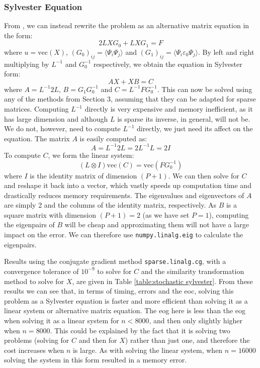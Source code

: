 \documentclass[11pt]{article}
\numberwithin{equation}{section}
\begin{document}
\subsubsection*{Sylvester Equation}
From \cite{Powell}, we can instead rewrite the problem as an alternative matrix equation in the form:
\begin{equation}
2LXG_0 + LXG_1 = F
\end{equation}
where $u = \text{vec}(X)$, $(G_0)_{ij} = \langle \Psi_i \Psi_j \rangle$ and $(G_1)_{ij} = \langle \Psi_i \varepsilon_0 \Psi_j \rangle$. By left and right multiplying by $L^{-1}$ and $G_0^{-1}$ respectively, we obtain the equation in Sylvester form:
\begin{equation}
AX + XB = C
\end{equation}
where $A = L^{-1}2L$, $B = G_1 G_0^{-1}$ and $C = L^{-1} F G_0^{-1}$. This can now be solved using any of the methods from Section 3, assuming that they can be adapted for sparse matrices. Computing $L^{-1}$ directly is very expensive and memory inefficient, as it has large dimension and although $L$ is sparse its inverse, in general, will not be. We do not, however, need to compute $L^{-1}$ directly, we just need its affect on the equation. The matrix $A$ is easily computed as: 
\[ A = L^{-1}2L = 2L^{-1}L = 2I \]
To compute $C$, we form the linear system:
\begin{equation}
(L \otimes I)\text{vec}(C) = \text{vec}(FG_0^{-1})
\end{equation}
where $I$ is the identity matrix of dimension $(P+1)$. We can then solve for $C$ and reshape it back into a vector, which vastly speeds up computation time and drastically reduces memory requirements. The eigenvalues and eigenvectors of $A$ are simply 2 and the columns of the identity matrix, respectively. As $B$ is a square matrix with dimension $(P+1)=2$ (as we have set $P=1$), computing the eigenpairs of $B$ will be cheap and approximating them will not have a large impact on the error. We can therefore use \texttt{numpy.linalg.eig} to calculate the eigenpairs.

Results using the conjugate gradient method \texttt{sparse.linalg.cg}, with a convergence tolerance of $10^{-9}$ to solve for $C$ and the similarity transformation method to solve for $X$, are given in Table \ref{table:stochastic sylvester}. From these results we can see that, in terms of timing, errors and the eoc, solving this problem as a Sylvester equation is faster and more efficient than solving it as a linear system or alternative matrix equation. The eog here is less than the eog when solving it as a linear system for $n<8000$, and then only slightly higher when $n=8000$. This could be explained by the fact that it is solving two problems (solving for $C$ and then for $X$) rather than just one, and therefore the cost increases when $n$ is large. As with solving the linear system, when $n=16000$ solving the system in this form resulted in a memory error.
\end{document}
